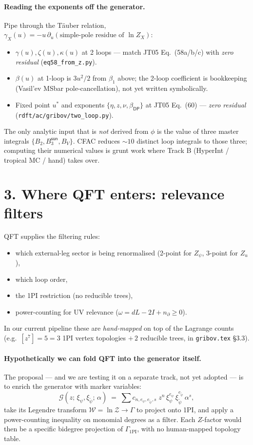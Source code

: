 \documentclass[11pt,a4paper]{article}
\begin{document}
\paragraph{Reading the exponents off the generator.} Pipe through the T\"auber relation, $\gamma_X(u) = -u\,\partial_u(\text{simple-pole residue of }\ln Z_X)$:
\begin{itemize}[leftmargin=2em,itemsep=1pt]
  \item $\gamma(u), \zeta(u), \kappa(u)$ at 2 loops --- match JT05 Eq.~(58a/b/c) with \emph{zero residual} (\texttt{eq58\_from\_z.py}).
  \item $\beta(u)$ at 1-loop is $3u^2/2$ from $\beta_1$ above; the 2-loop coefficient is bookkeeping (Vasil'ev MSbar pole-cancellation), not yet written symbolically.
  \item Fixed point $u^*$ and exponents $\{\eta, z, \nu, \beta_{\textsf{DP}}\}$ at JT05 Eq.~(60) --- \emph{zero residual} (\texttt{rdft/ac/gribov/two\_loop.py}).
\end{itemize}
The only analytic input that is \emph{not} derived from $\phi$ is the value of three master integrals $\{B_2, B_3^{\textsf{sun}}, B_V\}$. CFAC reduces $\sim 10$ distinct loop integrals to those three; computing their numerical values is grunt work where Track B (HyperInt / tropical MC / hand) takes over.

\section*{3. Where QFT enters: relevance filters}

QFT supplies the filtering rules:
\begin{itemize}[leftmargin=2em,itemsep=1pt]
  \item which external-leg sector is being renormalised (2-point for $Z_\psi$, 3-point for $Z_u$),
  \item which loop order,
  \item the 1PI restriction (no reducible trees),
  \item power-counting for UV relevance ($\omega = dL - 2I + n_\partial \ge 0$).
\end{itemize}
In our current pipeline these are \emph{hand-mapped} on top of the Lagrange counts (e.g.\ $[z^7]=5 = 3$ 1PI vertex topologies $+\,2$ reducible trees, in \texttt{gribov.tex} \S 3.3).

\paragraph{Hypothetically we can fold QFT into the generator itself.} The proposal --- and we are testing it on a separate track, not yet adopted --- is to enrich the generator with marker variables:
\[
  \mathcal{G}(z;\,\xi_\psi,\xi_{\tilde\psi};\,\alpha) \;=\; \sum c_{n,e_\psi,e_{\tilde\psi},s}\;
  z^n\,\xi_\psi^{e_\psi}\,\xi_{\tilde\psi}^{e_{\tilde\psi}}\,\alpha^s,
\]
take its Legendre transform $\mathcal{W} = \ln \mathcal{Z} \to \Gamma$ to project onto 1PI, and apply a power-counting inequality on monomial degrees as a filter. Each $Z$-factor would then be a specific bidegree projection of $\Gamma_{\text{1PI}}$, with no human-mapped topology table.
\end{document}
